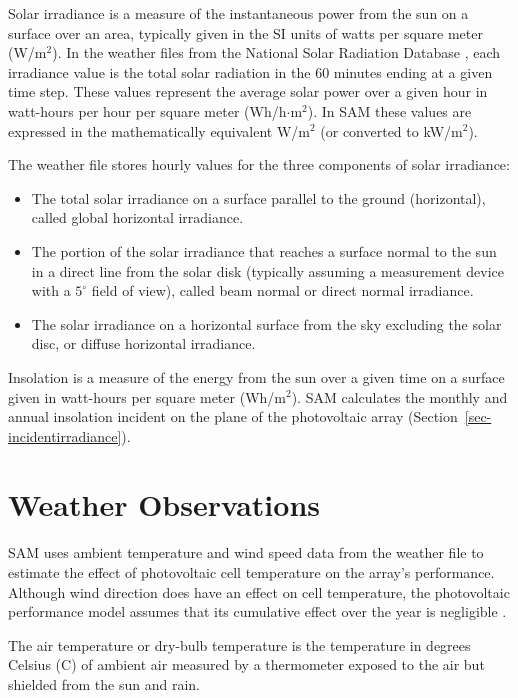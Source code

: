 \documentclass[12pt,letterpaper]{article}
\begin{document}

Solar irradiance is a measure of the instantaneous power from the sun on a surface over an area, typically given in the SI units of watts per square meter (W/m$^2$). In the weather files from the National Solar Radiation Database \citep{nsrdb}, each irradiance value is the total solar radiation in the 60 minutes ending at a given time step. These values represent the average solar power over a given hour in watt-hours per hour per square meter (Wh/h$\cdot$m$^2$). In SAM these values are expressed in the mathematically equivalent W/m$^2$ (or converted to kW/m$^2$).

The weather file stores hourly values for the three components of solar irradiance:

\begin{itemize}
\item The total solar irradiance on a surface parallel to the ground (horizontal), called global horizontal irradiance.
\item The portion of the solar irradiance that reaches a surface normal to the sun in a direct line from the solar disk (typically assuming a measurement device with a $5^{\circ}$ field of view), called beam normal or direct normal irradiance.
\item The solar irradiance on a horizontal surface from the sky excluding the solar disc, or diffuse horizontal irradiance.
\end{itemize}

Insolation is a measure of the energy from the sun over a given time on a surface given in watt-hours per square meter (Wh/m$^2$). SAM calculates the monthly and annual insolation incident on the plane of the photovoltaic array (Section~\ref{sec-incidentirradiance}). 

\section{Weather Observations}

SAM uses ambient temperature and wind speed data from the weather file to estimate the effect of photovoltaic cell temperature on the array's performance. Although wind direction does have an effect on cell temperature, the photovoltaic performance model assumes that its cumulative effect over the year is negligible \citep{king2004}.

The air temperature or dry-bulb temperature is the temperature in degrees Celsius (\degree C) of ambient air measured by a thermometer exposed to the air but shielded from the sun and rain. 
\end{document}
